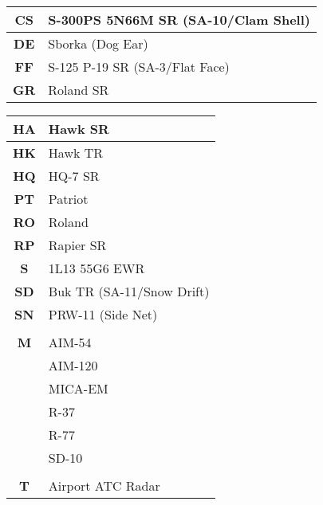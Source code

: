 \documentclass[fontSpartan]{TechCheck}
\begin{document}
\begin{multicols*}{2}
\begin{center}
\begin{tabular}{c | p{4cm}}
			\midrule
			\textbf{CS} & S-300PS 5N66M SR (SA-10/Clam Shell) \\
			\midrule
			\textbf{DE} & Sborka (Dog Ear) \\
			\midrule
			\textbf{FF} & S-125 P-19 SR (SA-3/Flat Face) \\
			\midrule
			\textbf{GR} & Roland SR \\
			\midrule
		\end{tabular}
	\end{center}
	\begin{center}
		\begin{tabular}{c | p{4cm}}
			\textbf{HA} & Hawk SR \\
			\midrule
			\textbf{HK} & Hawk TR \\
			\midrule
			\textbf{HQ} & HQ-7 SR \\
			\midrule
			\textbf{PT} & Patriot \\
			\midrule
			\textbf{RO} & Roland \\
			\midrule
			\textbf{RP} & Rapier SR \\
			\midrule
			\textbf{S} & 1L13 55G6 EWR \\
			\midrule
			\textbf{SD} & Buk TR (SA-11/Snow Drift) \\
			\midrule
			\textbf{SN} & PRW-11 (Side Net) \\
			\midrule
			\multicolumn{2}{c}{\blue{MISSILES}} \\
			\toprule
			\textbf{M} & AIM-54 \\
			& AIM-120 \\
			& MICA-EM \\
			& R-37 \\
			& R-77 \\
			& SD-10 \\
			\midrule
			\multicolumn{2}{c}{\blue{ATC}} \\
			\toprule
			\textbf{T} & Airport ATC Radar \\
			\bottomrule
		\end{tabular}
	\end{center}
	\end{multicols*}
\end{document}

